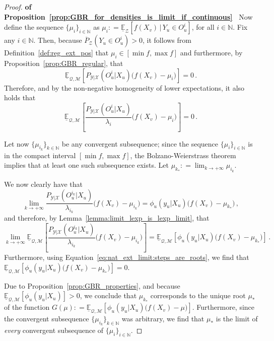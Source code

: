 \documentclass[twoside,11pt]{article}
\newcommand{\nats}{\mathbb{N}}
\newcommand{\states}{\mathcal{X}}
\newcommand{\observs}{\mathcal{Y}}
\newcommand{\lexp}{\underline{\mathbb{E}}_{\rateset,\mathcal{M}}}
\newcommand{\rateset}{\mathcal{Q}}
\newcommand{\coloneqq}{:\!=}
\begin{document}
\begin{proof}{\bf of Proposition~\ref{prop:GBR_for_densities_is_limit_if_continuous}~}
Now define the sequence $\{\mu_i\}_{i\in\nats}$ as $\mu_i\coloneqq \underline{\mathbb{E}}_\mathcal{Z}[f(X_v)\,\vert\,Y_u\in O_u^i]$, for all $i\in\nats$.
Fix any $i\in\nats$. Then, because $\overline{P}_{\mathcal{Z}}(Y_u\in O_u^i)>0$, it follows from Definition~\ref{def:reg_ext_pos} that $\mu_i\in[\min f, \max f]$ and furthermore, by Proposition~\ref{prop:GBR_regular}, that
\begin{equation*}
\lexp[P_{\observs\vert\states}(O_u^i\vert X_u)\bigl(f(X_v) - \mu_i\bigr)] = 0\,.
\end{equation*}
Therefore, and by the non-negative homogeneity of lower expectations, it also holds that
\begin{equation}\label{eq:nat_ext_limit:steps_are_roots}
\lexp\left[\frac{P_{\observs\vert\states}(O_u^i\vert X_u)}{\lambda_i}\bigl(f(X_v) - \mu_i\bigr)\right] = 0\,.
\end{equation}

Let now $\{\mu_{i_k}\}_{k\in\nats}$ be any convergent subsequence; since the sequence $\{\mu_i\}_{i\in\nats}$ is in the compact interval $[\min f,\max f]$, the Bolzano-Weierstrass theorem implies that at least one such subsequence exists. Let $\mu_{k_*}\coloneqq \lim_{k\to+\infty}\mu_{i_k}$.

We now clearly have that
\begin{equation*}
\lim_{k\to+\infty} \frac{P_{\observs\vert\states}(O_u^{i_k}\vert X_u)}{\lambda_{i_k}}\bigl(f(X_v) - \mu_{i_k}\bigr) = \phi_u(y_u\vert X_u)\bigl(f(X_v) - \mu_{k_*}\bigr)\,,
\end{equation*}
and therefore, by Lemma~\ref{lemma:limit_lexp_is_lexp_limit}, that
\begin{equation*}
\lim_{k\to+\infty} \lexp\left[\frac{P_{\observs\vert\states}(O_u^{i_k}\vert X_u)}{\lambda_{i_k}}\bigl(f(X_v) - \mu_{i_k}\bigr)\right] = \lexp\left[\phi_u(y_u\vert X_u)\bigl(f(X_v) - \mu_{k_*}\bigr)\right]\,.
\end{equation*}
Furthermore, using Equation~\eqref{eq:nat_ext_limit:steps_are_roots}, we find that $\lexp\left[\phi_u(y_u\vert X_u)\bigl(f(X_v) - \mu_{k_*}\bigr)\right] = 0$.

Due to Proposition~\ref{prop:GBR_properties}, and because $\lexp[\phi_u(y_u\vert X_u)]>0$, we conclude that $\mu_{k_*}$ corresponds to the unique root $\mu_*$ of the function $G(\mu)\coloneqq \lexp\left[\phi_u(y_u\vert X_u)\bigl(f(X_v) - \mu\bigr)\right]$. Furthermore, since the convergent subsequence $\{\mu_{i_k}\}_{k\in\nats}$ was arbitrary, we find that $\mu_*$ is the limit of \emph{every} convergent subsequence of $\{\mu_i\}_{i\in\nats}$.


\end{proof}
\end{document}
